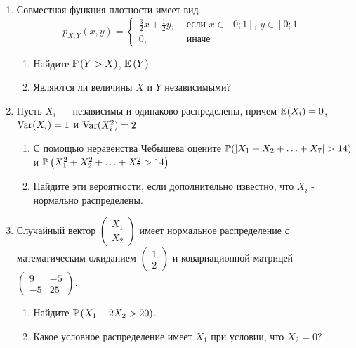 \begin{enumerate}
\item Совместная функция плотности имеет вид
\[
p_{X,Y} \left(x,y\right)=
\begin{cases}
\frac{3}{2}x+\frac{1}{2}y, & \text{ если } x\in \left[0;1\right],\, y\in \left[0;1\right] \\
0, & \text{ иначе}
\end{cases}
\]
\begin{enumerate}
\item Найдите  $\P\left(Y>X\right)$,  $\E\left(Y\right)$
\item Являются ли величины $X$ и $Y$ независимыми?
\end{enumerate}

\item Пусть $X_{i}$ — независимы и одинаково распределены, причем $\E(X_{i}) = 0$,
$\Var(X_{i}) = 1$ и $\Var(X_{i}^{2}) = 2$
\begin{enumerate}
\item С помощью неравенства Чебышева оцените $\P(|X_{1} + X_{2} + \ldots + X_{7}| > 14)$ и
$\P\left(X_{1}^{2} + X_{2}^{2} + \ldots + X_{7}^{2} > 14\right)$
\item Найдите эти вероятности, если дополнительно известно, что $X_{i}$ - нормально
распределены.
\end{enumerate}

\item Случайный вектор  $\left(\begin{array}{c}
{X_{1} } \\ {X_{2} }
\end{array}\right)$  имеет нормальное распределение с
математическим ожиданием  $\left(\begin{array}{c} {1} \\ {2}
\end{array}\right)$  и ковариационной матрицей
$\left(\begin{array}{cc} {9} & {-5} \\ {-5} & {25}
\end{array}\right)$.
\begin{enumerate}
\item Найдите  $\P\left(X_{1} + 2X_{2} > 20\right)$.
\item Какое условное распределение имеет $X_{1}$ при условии, что $X_{2} = 0$?
\end{enumerate}



\end{enumerate}
